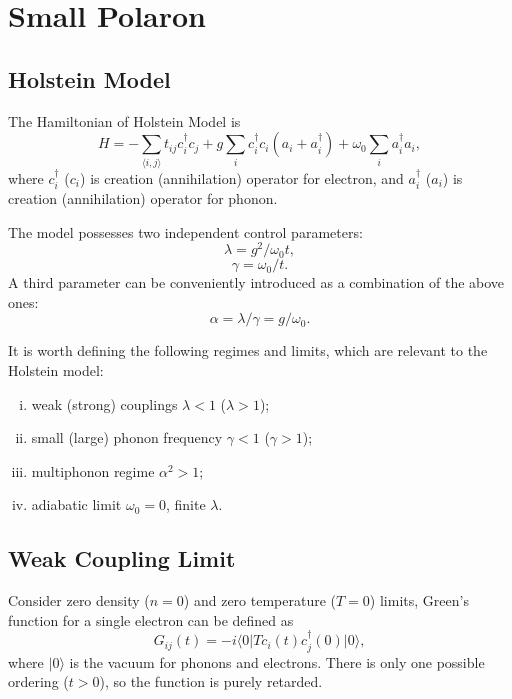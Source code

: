 \documentclass{book}
\newcommand{\bra}[1]{{\langle#1|}}
\newcommand{\ket}[1]{{|#1\rangle}}
\numberwithin{equation}{section}
\begin{document}
\chapter{Small Polaron}
\section{Holstein Model}
The Hamiltonian of Holstein Model is
\begin{equation}
  H=-\sum_{\langle{i,j}\rangle}t_{ij}c_i^\dag c_j+g\sum_ic_i^\dag c_i(a_i+a_i^\dag)
  +\omega_0\sum_ia_i^\dag a_i,
  \label{Holstein}
\end{equation}
where $c_i^\dag$ ($c_i$) is creation (annihilation) operator for electron, and
$a_i^\dag$ ($a_i$) is creation (annihilation) operator for phonon.

The model possesses two independent control parameters:
\begin{equation}
  \lambda =g^2/\omega_0t,
\end{equation}
\begin{equation}
  \gamma=\omega_0/t.
\end{equation}
A third parameter can be conveniently introduced as a combination of
the above ones:
\begin{equation}
  \alpha=\lambda/\gamma=g/\omega_0.
\end{equation}

It is worth defining the following regimes and limits, which are relevant 
to the Holstein model:

\begin{enumerate}[(i)]
\item weak (strong) couplings $\lambda<1$ ($\lambda>1$);
\item small (large) phonon frequency $\gamma<1$ ($\gamma>1$);
\item multiphonon regime $\alpha^2>1$;
\item adiabatic limit $\omega_0=0$, finite $\lambda$.
\end{enumerate}

\section{Weak Coupling Limit}
Consider zero density ($n=0$) and zero temperature ($T=0$) limits,
Green's function for a single electron can be defined as
\begin{equation}
  G_{ij}(t)=-i\bra{0}Tc_i(t)c_j^\dag(0)\ket{0},
\end{equation}
where $\ket{0}$ is the vacuum for phonons and electrons. There is only
one possible ordering ($t>0$), so the function is purely retarded.
\end{document}
